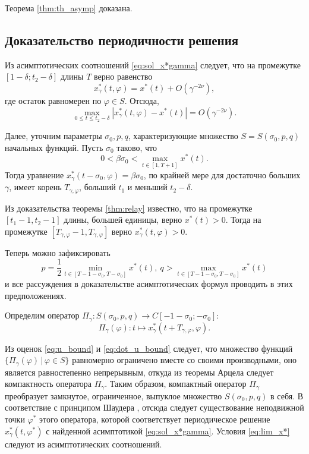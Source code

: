 Теорема \ref{thm:th_asymp} доказана.

\subsection{Доказательство периодичности решения}

Из асимптотических соотношений \eqref{eq:sol_x*gamma} следует, что на промежутке $[1 - \delta; t_2 - \delta]$ длины $T$ верно равенство
\[
x_\gamma^*(t, \varphi) = x^*(t) + O(\gamma^{-2\nu}),
\]
где остаток равномерен по $\varphi \in S$.
Отсюда,
\[
\max\limits_{0 \leqslant t \leqslant t_2 - \delta}|x_\gamma^*(t, \varphi) - x^*(t)| = O(\gamma^{-2\nu}).
\]

Далее, уточним параметры $\sigma_0, p, q$, характеризующие множество $S = S(\sigma_0, p, q)$ начальных функций. Пусть $\sigma_0$ таково, что
%
\[
0 < \beta \sigma_0 < \max\limits_{t \in [1, T + 1]} x^*(t).
\]
%
Тогда уравнение $x^*_\gamma(t - \sigma_0, \varphi) = \beta \sigma_0$, по крайней мере для достаточно больших $\gamma$, имеет корень $T_{\gamma, \varphi}$, больший $t_1$ и меньший $t_2 - \delta$.

Из доказательства теоремы \ref{thm:relay} известно, что на промежутке $[t_1 - 1, t_2 - 1]$ длины, большей единицы, верно $x^*(t) > 0$. Тогда на промежутке $[T_{\gamma, \varphi} - 1, T_{\gamma, \varphi}]$ верно $x^*_{\gamma}(t, \varphi) > 0$.

Теперь можно зафиксировать
\[
p = \frac{1}{2}\min\limits_{t \in [T - 1 - \sigma_0, T - \sigma_0]} x^*(t), \ q > \max\limits_{t \in [T - 1 - \sigma_0, T - \sigma_0]} x^*(t)
\]
и все рассуждения в доказательстве асимптотических формул проводить в этих предположениях.

Определим оператор $\Pi_{\gamma}: S(\sigma_0, p, q) \to C[-1-\sigma_0; -\sigma_0]$:
\begin{equation}
	\Pi_{\gamma}(\varphi): t \mapsto x^*_{\gamma}(t + T_{\gamma, \varphi}, \varphi).
\end{equation}

Из оценок \eqref{eq:u_bound} и \eqref{eq:dot_u_bound} следует, что множество функций $\{\Pi_{\gamma}(\varphi)\, | \, \varphi \in S\}$ равномерно ограничено вместе со своими производными, оно является равностепенно непрерывным, откуда из теоремы Арцела следует компактность оператора $\Pi_{\gamma}$. Таким образом, компактный оператор $\Pi_{\gamma}$ преобразует замкнутое, ограниченное, выпуклое множество $S(\sigma_0, p, q)$ в себя. В соответствие с принципом Шаудера \cite{Krasnov1975}, отсюда следует существование неподвижной точки $\varphi^*$ этого оператора, которой соответствует периодическое решение $x^*_\gamma(t, \varphi^*)$ с найденной асимптотикой \eqref{eq:sol_x*gamma}. Условия \eqref{eq:lim_x*} следуют из асимптотических соотношений.

